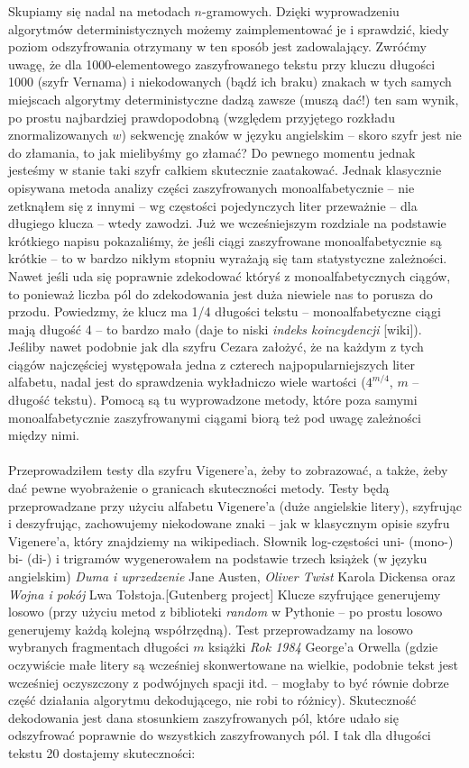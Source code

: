 \documentclass[a4paper]{article}
\begin{document}
Skupiamy się nadal na metodach $n$-gramowych. Dzięki wyprowadzeniu algorytmów deterministycznych możemy zaimplementować je i sprawdzić, kiedy poziom odszyfrowania otrzymany w ten sposób jest zadowalający. Zwróćmy uwagę, że dla 1000-elementowego zaszyfrowanego tekstu przy kluczu długości 1000 (szyfr Vernama) i niekodowanych (bądź ich braku) znakach w tych samych miejscach algorytmy deterministyczne dadzą zawsze (muszą dać!) ten sam wynik, po prostu najbardziej prawdopodobną (względem przyjętego rozkładu znormalizowanych $w$) sekwencję znaków w języku angielskim – skoro szyfr jest nie do złamania, to jak mielibyśmy go złamać? Do pewnego momentu jednak jesteśmy w stanie taki szyfr całkiem skutecznie zaatakować. Jednak klasycznie opisywana metoda analizy części zaszyfrowanych monoalfabetycznie – nie zetknąłem się z innymi – wg częstości pojedynczych liter przeważnie – dla długiego klucza – wtedy zawodzi. Już we wcześniejszym rozdziale na podstawie krótkiego napisu pokazaliśmy, że jeśli ciągi zaszyfrowane monoalfabetycznie są krótkie – to w bardzo nikłym stopniu wyrażają się tam statystyczne zależności. Nawet jeśli uda się poprawnie zdekodować któryś z monoalfabetycznych ciągów, to ponieważ liczba pól do zdekodowania jest duża niewiele nas to porusza do przodu. Powiedzmy, że klucz ma 1/4 długości tekstu – monoalfabetyczne ciągi mają długość 4 – to bardzo mało (daje to niski \textit{indeks koincydencji} [wiki]). Jeśliby nawet podobnie jak dla szyfru Cezara założyć, że na każdym z tych ciągów najczęściej występowała jedna z czterech najpopularniejszych liter alfabetu, nadal jest do sprawdzenia wykładniczo wiele wartości ($4^{m/4}$, $m$ – długość tekstu). Pomocą są tu wyprowadzone metody, które poza samymi monoalfabetycznie zaszyfrowanymi ciągami biorą też pod uwagę zależności między nimi. \\\\
Przeprowadziłem testy dla szyfru Vigenere'a, żeby to zobrazować, a także, żeby dać pewne wyobrażenie o granicach skuteczności metody. Testy będą przeprowadzane przy użyciu alfabetu Vigenere'a (duże angielskie litery), szyfrując i deszyfrując, zachowujemy niekodowane znaki – jak w klasycznym opisie szyfru Vigenere'a, który znajdziemy na wikipediach. Słownik log-częstości uni- (mono-) bi- (di-) i trigramów wygenerowałem na podstawie trzech książek (w języku angielskim) \textit{Duma i uprzedzenie} Jane Austen, \textit{Oliver Twist} Karola Dickensa oraz \textit{Wojna i pokój} Lwa Tołstoja.[Gutenberg project] Klucze szyfrujące generujemy losowo (przy użyciu metod z biblioteki \textit{random} w Pythonie – po prostu losowo generujemy każdą kolejną współrzędną). Test przeprowadzamy na losowo wybranych fragmentach długości $m$ książki \textit{Rok 1984} George'a Orwella (gdzie oczywiście małe litery są wcześniej skonwertowane na wielkie, podobnie tekst jest wcześniej oczyszczony z podwójnych spacji itd. – mogłaby to być równie dobrze część działania algorytmu dekodującego, nie robi to różnicy). Skuteczność dekodowania jest dana stosunkiem zaszyfrowanych pól, które udało się odszyfrować poprawnie do wszystkich zaszyfrowanych pól. I tak dla długości tekstu 20 dostajemy skuteczności:\\
\end{document}
